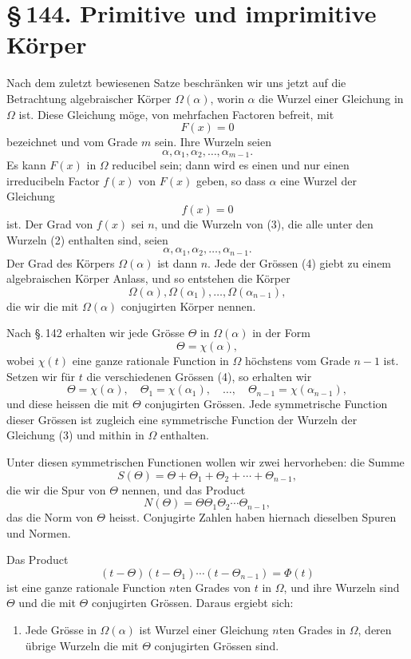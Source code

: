 \documentclass[11pt]{article}
\providecommand{\sect}[2]{\section*{\S\,#1. #2}}
\begin{document}
\sect{144}{Primitive und imprimitive Körper}

Nach dem zuletzt bewiesenen Satze beschränken wir uns jetzt auf die Betrachtung algebraischer Körper $\Omega(\alpha)$, worin $\alpha$ die Wurzel einer Gleichung in $\Omega$ ist. Diese Gleichung möge, von mehrfachen Factoren befreit, mit
\[
\tag{1}
        F(x)=0
\]
bezeichnet und vom Grade $m$ sein. Ihre Wurzeln seien
\[
\tag{2}
        \alpha,\alpha_1,\alpha_2,\ldots,\alpha_{m-1}.
\]
Es kann $F(x)$ in $\Omega$ reducibel sein; dann wird es einen und nur einen irreducibeln Factor $f(x)$ von $F(x)$ geben, so dass $\alpha$ eine Wurzel der Gleichung
\[
\tag{3}
        f(x)=0
\]
ist. Der Grad von $f(x)$ sei $n$, und die Wurzeln von (3), die alle unter den Wurzeln (2) enthalten sind, seien
\[
\tag{4}
        \alpha,\alpha_1,\alpha_2,\ldots,\alpha_{n-1}.
\]
Der Grad des Körpers $\Omega(\alpha)$ ist dann $n$. Jede der Grössen (4) giebt zu einem algebraischen Körper Anlass, und so entstehen die Körper
\[
\tag{5}
        \Omega(\alpha),\Omega(\alpha_1),\ldots,\Omega(\alpha_{n-1}),
\]
die wir die mit $\Omega(\alpha)$ conjugirten Körper nennen.

Nach §.\,142 erhalten wir jede Grösse $\Theta$ in $\Omega(\alpha)$ in der Form
\[
        \Theta=\chi(\alpha),
\]
wobei $\chi(t)$ eine ganze rationale Function in $\Omega$ höchstens vom Grade $n-1$ ist. Setzen wir für $t$ die verschiedenen Grössen (4), so erhalten wir
\[
\tag{6}
        \Theta=\chi(\alpha),\quad
        \Theta_1=\chi(\alpha_1),\quad\ldots,\quad
        \Theta_{n-1}=\chi(\alpha_{n-1}),
\]
und diese heissen die mit $\Theta$ conjugirten Grössen. Jede symmetrische Function dieser Grössen ist zugleich eine symmetrische Function der Wurzeln der Gleichung (3) und mithin in $\Omega$ enthalten.

Unter diesen symmetrischen Functionen wollen wir zwei hervorheben: die Summe
\[
\tag{7}
        S(\Theta)=\Theta+\Theta_1+\Theta_2+\cdots+\Theta_{n-1},
\]
die wir die Spur von $\Theta$ nennen, und das Product
\[
\tag{8}
        N(\Theta)=\Theta\Theta_1\Theta_2\cdots\Theta_{n-1},
\]
das die Norm von $\Theta$ heisst. Conjugirte Zahlen haben hiernach dieselben Spuren und Normen.

Das Product
\[
\tag{9}
        (t-\Theta)(t-\Theta_1)\cdots(t-\Theta_{n-1})=\Phi(t)
\]
ist eine ganze rationale Function $n$ten Grades von $t$ in $\Omega$, und ihre Wurzeln sind $\Theta$ und die mit $\Theta$ conjugirten Grössen. Daraus ergiebt sich:
\begin{enumerate}[label=\arabic*.,leftmargin=2em]
\item Jede Grösse in $\Omega(\alpha)$ ist Wurzel einer Gleichung $n$ten Grades in $\Omega$, deren übrige Wurzeln die mit $\Theta$ conjugirten Grössen sind.
\end{enumerate}
\end{document}
